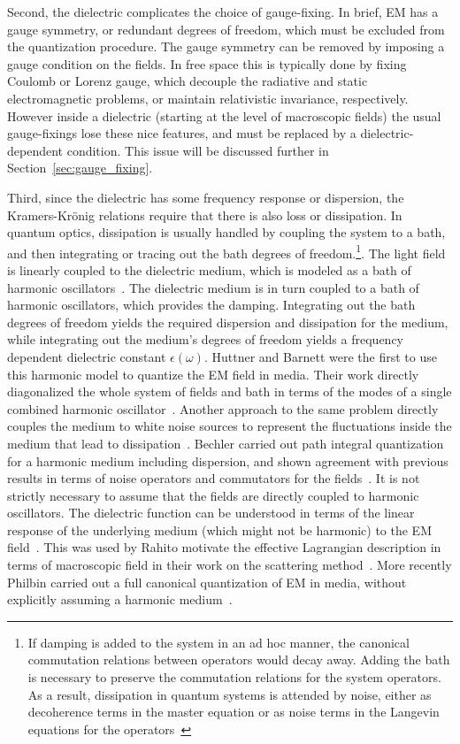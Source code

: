Second, the dielectric complicates the choice of gauge-fixing.  
In brief, EM has a gauge symmetry, or redundant degrees of freedom, which must be 
excluded from the quantization procedure.  
The gauge symmetry can be removed by imposing a gauge condition on the fields.
  In free space this is typically done by fixing Coulomb or Lorenz gauge, which 
decouple the radiative and static electromagnetic problems, or maintain relativistic invariance, respectively.
However inside a dielectric (starting at the level of macroscopic fields) the usual gauge-fixings lose these nice
features, and must be replaced by a dielectric-dependent condition.  
This issue will be discussed further in Section~\ref{sec:gauge_fixing}.

Third, since the dielectric has some frequency response or dispersion, the Kramers-Kr\"onig relations 
require that there is also loss or dissipation.  
In  quantum optics, dissipation is usually handled by coupling the system to a bath, and then
integrating or tracing out the bath degrees of freedom.\footnote{If damping is added to the system in an ad hoc
manner, the canonical commutation relations between operators would decay away.  Adding the bath
is necessary to preserve the commutation relations for the system operators.  As a result, dissipation in quantum systems 
is attended by noise, either as decoherence terms in the master equation or as noise terms in the Langevin equations for the operators~\cite{GardinerZoller2004}}.
The light field is linearly coupled to the dielectric medium, which is modeled
as a bath of harmonic oscillators~\cite{Huttner1992,Dung1998,Bechler1999}.
The dielectric medium is in turn coupled to a bath of harmonic oscillators, which provides the damping.
Integrating out the bath degrees of freedom yields the required dispersion and dissipation for the medium, 
while integrating out the medium's degrees of freedom yields a frequency dependent dielectric constant $\epsilon(\omega)$.
Huttner and Barnett were the first to use this harmonic model to quantize the EM field in media. Their
work directly diagonalized the whole system of fields and bath in terms of the modes of 
a single combined harmonic oscillator~\cite{Huttner1992}.
Another approach to the same problem directly couples the medium to white noise sources to represent the fluctuations 
inside the medium that lead to dissipation~\cite{Scheel1998,Dung1998,Tip2001}.
Bechler carried out path integral quantization for a harmonic medium 
including dispersion, and shown agreement with previous results in terms 
of noise operators and commutators for the fields~\cite{Bechler1999,Bechler2006}.  
It is not strictly necessary to assume that the fields are directly coupled to harmonic oscillators. 
The dielectric function can be understood in terms of the linear response of the underlying 
medium (which might not be harmonic) to the EM field~\cite{Altland2011}.  
This was used by Rahi\etal to motivate the effective Lagrangian description in terms of macroscopic field in their 
work on the scattering method~\cite{Rahi2009}.  
More recently Philbin carried out a full canonical quantization of EM in media, without explicitly 
assuming a harmonic medium~\cite{Philbin2010}.


